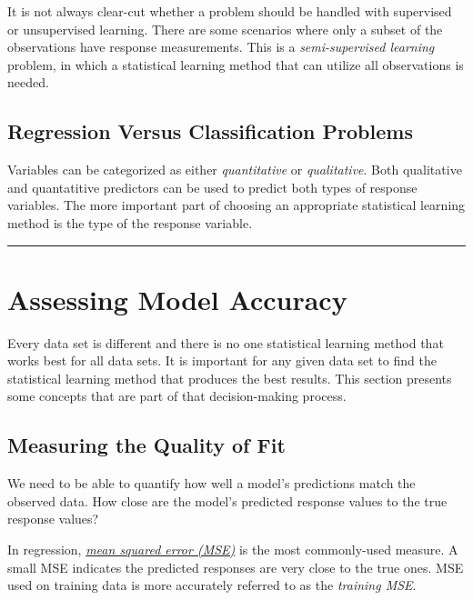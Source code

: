 \documentclass[]{book}
\theoremstyle{definition}
\theoremstyle{definition}
\theoremstyle{definition}
\theoremstyle{remark}
\begin{document}
It is not always clear-cut whether a problem should be handled with
supervised or unsupervised learning. There are some scenarios where only
a subset of the observations have response measurements. This is a
\emph{semi-supervised learning} problem, in which a statistical learning
method that can utilize all observations is needed.

\subsection{Regression Versus Classification
Problems}\label{regression-versus-classification-problems}

Variables can be categorized as either \emph{quantitative} or
\emph{qualitative}. Both qualitative and quantatitive predictors can be
used to predict both types of response variables. The more important
part of choosing an appropriate statistical learning method is the type
of the response variable.

\begin{center}\rule{0.5\linewidth}{\linethickness}\end{center}

\section{Assessing Model Accuracy}\label{assessing-model-accuracy}

Every data set is different and there is no one statistical learning
method that works best for all data sets. It is important for any given
data set to find the statistical learning method that produces the best
results. This section presents some concepts that are part of that
decision-making process.

\subsection{Measuring the Quality of
Fit}\label{measuring-the-quality-of-fit}

We need to be able to quantify how well a model's predictions match the
observed data. How close are the model's predicted response values to
the true response values?

In regression,
\href{https://en.wikipedia.org/wiki/Mean_squared_error}{\emph{mean
squared error (MSE)}} is the most commonly-used measure. A small MSE
indicates the predicted responses are very close to the true ones. MSE
used on training data is more accurately referred to as the
\emph{training MSE}.
\end{document}
